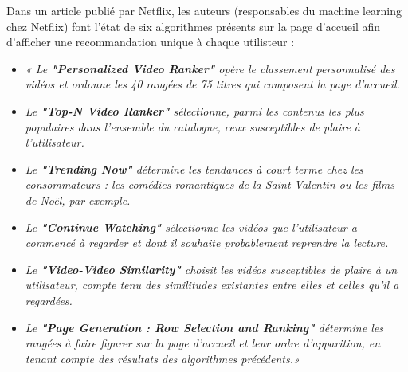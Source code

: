 \vspace{5mm}

Dans un article publié par Netflix\supercite{netflixRS&BusinessValue}, les auteurs (responsables du machine learning chez Netflix) font l'état de six algorithmes présents sur la page d’accueil afin d’afficher une recommandation unique à chaque utilisteur : 

\vspace{5mm}


\begin{itemize}
    \item \textit{« Le \textbf{"Personalized Video Ranker"} opère le classement personnalisé des vidéos et ordonne les 40 rangées de 75 titres qui composent la page d’accueil.}
    
    \vspace{2mm}
    
    \item \textit{Le \textbf{"Top-N Video Ranker"} sélectionne, parmi les contenus les plus populaires dans l’ensemble du catalogue, ceux susceptibles de plaire à l’utilisateur.}
    
    \vspace{2mm}
    
    \item \textit{Le \textbf{"Trending Now"} détermine les tendances à court terme chez les consommateurs : les comédies romantiques de la Saint-Valentin ou les films de Noël, par exemple.}
    
    \vspace{2mm}
    
    \item \textit{Le \textbf{"Continue Watching"} sélectionne les vidéos que l’utilisateur a commencé à regarder et dont il souhaite probablement reprendre la lecture.}
    
    \vspace{2mm}
    
    \item \textit{Le \textbf{"Video-Video Similarity"} choisit les vidéos susceptibles de plaire à un utilisateur, compte tenu des similitudes existantes entre elles et celles qu’il a regardées.}
    
    \vspace{2mm}
    
    \item \textit{Le \textbf{"Page Generation : Row Selection and Ranking"} détermine les rangées à faire figurer sur la page d’accueil et leur ordre d’apparition, en tenant compte des résultats des algorithmes précédents.»}\supercite{franceInfoEnq}
   
\end{itemize}

